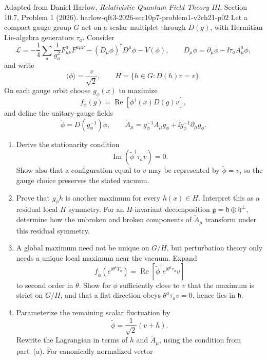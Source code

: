\begin{enumerate}
  {Adapted from Daniel Harlow, \emph{Relativistic Quantum Field Theory III},
  Section 10.7, Problem 1 (2026).}
  {harlow-qft3-2026-sec10p7-problem1-v2ch21-p02}
  Let a compact gauge group \(G\) act on a scalar multiplet through
  \(D(g)\), with Hermitian Lie-algebra generators \(\tau_a\).  Consider
  \[
    \mathcal L=-\frac14\sum_a\frac1{g_a^2}
      F_{\mu\nu}^aF^{a\mu\nu}
      -(D_\mu\phi)^\dagger D^\mu\phi-V(\phi),
    \qquad
    D_\mu\phi=\partial_\mu\phi-\ii\tau_aA_\mu^a\phi ,
  \]
  and write
  \[
    \langle\phi\rangle=\frac v{\sqrt2},\qquad
    H=\{h\in G:D(h)v=v\}.
  \]
  On each gauge orbit choose \(g_\phi(x)\) to maximize
  \[
    f_\phi(g)=\operatorname{Re}\!\left[\phi^\dagger(x)D(g)v\right],
  \]
  and define the unitary-gauge fields
  \[
    \widetilde\phi=D(g_\phi^{-1})\phi,\qquad
    \widetilde A_\mu=g_\phi^{-1}A_\mu g_\phi+
      \ii g_\phi^{-1}\partial_\mu g_\phi .
  \]
  \begin{enumerate}
    \item[(a)]
    Derive the stationarity condition
    \[
      \operatorname{Im}(\widetilde\phi^\dagger\tau_av)=0 .
    \]
    Show also that a configuration equal to \(v\) may be represented by
    \(\widetilde\phi=v\), so the gauge choice preserves the stated vacuum.
    \item[(b)]
    Prove that \(g_\phi h\) is another maximum for every \(h(x)\in H\).
    Interpret this as a residual local \(H\) symmetry.  For an
    \(H\)-invariant decomposition
    \(\mathfrak g=\mathfrak h\oplus\mathfrak h^\perp\), determine how the
    unbroken and broken components of \(\widetilde A_\mu\) transform under
    this residual symmetry.
    \item[(c)]
    A global maximum need not be unique on \(G/H\), but perturbation theory
    only needs a unique local maximum near the vacuum.  Expand
    \[
      f_{\widetilde\phi}(e^{\ii\theta^aT_a})
        =\operatorname{Re}\!
        \left[\widetilde\phi^\dagger
          e^{\ii\theta^a\tau_a}v\right]
    \]
    to second order in \(\theta\).  Show for
    \(\widetilde\phi\) sufficiently close to \(v\) that the maximum is
    strict on \(G/H\), and that a flat direction obeys
    \(\theta^a\tau_av=0\), hence lies in \(\mathfrak h\).
    \item[(d)]
    Parameterize the remaining scalar fluctuation by
    \[
      \widetilde\phi=\frac1{\sqrt2}(v+h).
    \]
    Rewrite the Lagrangian in terms of \(h\) and \(\widetilde A_\mu\),
    using the condition from part~(a).  For canonically normalized vector

\end{enumerate}
\end{enumerate}
